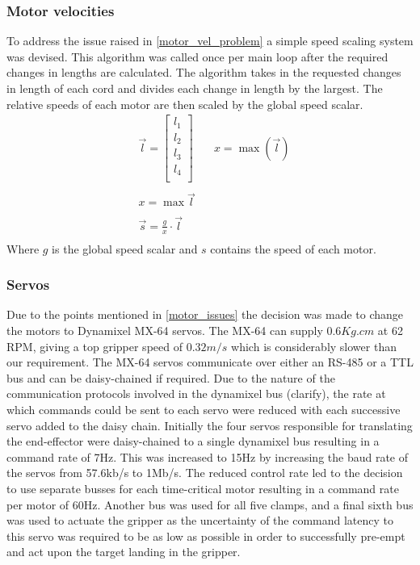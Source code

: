 \documentclass[conference]{IEEEtran}
\begin{document}
\subsubsection{Motor velocities}\label{motor_speed_section}
To address the issue raised in \ref{motor_vel_problem} a simple speed scaling system was devised. This algorithm was called once per main loop after the required changes in lengths are calculated. The algorithm takes in the requested changes in length of each cord and divides each change in length by the largest. The relative speeds of each motor are then scaled by the global speed scalar.
\begin{equation}\label{motor_speed_equation}
\begin{aligned}
&\vec{l} = \begin{bmatrix}
l_1\\l_2\\l_3\\l_4\\
\end{bmatrix}\quad
&x = \max\left(\vec{l}\right)\\\\
&x = \max\vec{l}\\\\
&\vec{s} = \frac{g}{x}\cdot \vec{l}\\
\end{aligned}
\end{equation}
Where $g$ is the global speed scalar and $s$ contains the speed of each motor.
\subsubsection{Servos}
Due to the points mentioned in \ref{motor_issues} the decision was made to change the motors to Dynamixel MX-64 servos. The MX-64 can supply $0.6Kg.cm$ at 62 RPM, giving a top gripper speed of $0.32m/s$ which is considerably slower than our requirement. The MX-64 servos communicate over either an RS-485 or a TTL bus and can be daisy-chained if required. Due to the nature of the communication protocols involved in the dynamixel bus (clarify), the rate at which commands could be sent to each servo were reduced with each successive servo added to the daisy chain. Initially the four servos responsible for translating the end-effector were daisy-chained to a single dynamixel bus resulting in a command rate of 7Hz. This was increased to 15Hz by increasing the baud rate of the servos from 57.6kb/s to 1Mb/s. The reduced control rate led to the decision to use separate busses for each time-critical motor resulting in a command rate per motor of 60Hz. Another bus was used for all five clamps, and a final sixth bus was used to actuate the gripper as the uncertainty of the command latency to this servo was required to be as low as possible in order to successfully pre-empt and act upon the target landing in the gripper. 
\end{document}
